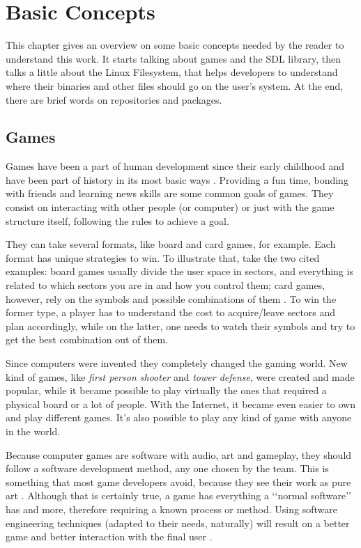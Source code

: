 \chapter{Basic Concepts}
\label {sec:basic_concepts}

This chapter gives an overview on some basic concepts needed by the reader to understand this work. It starts talking about games and the SDL library, then talks a little about the Linux Filesystem, that helps developers to understand where their binaries and other files should go on the user's system. At the end, there are brief words on repositories and packages.

\section{Games}
\label {sec:games}

Games have been a part of human development since their early childhood and have been part of history in its most basic ways \cite{bethke2003game}. Providing a fun time, bonding with friends and learning news skills are some common goals of games. They consist on interacting with other people (or computer) or just with the game structure itself, following the rules to achieve a goal.

They can take several formats, like board and card games, for example. Each format has unique strategies to win. To illustrate that, take the two cited examples: board games usually divide the user space in sectors, and everything is related to which sectors you are in and how you control them; card games, however, rely on the symbols and possible combinations of them \cite{crawford1984art}. To win the former type, a player has to understand the cost to acquire/leave sectors and plan accordingly, while on the latter, one needs to watch their symbols and try to get the best combination out of them.

Since computers were invented they completely changed the gaming world. New kind of games, like \textit{first person shooter} and \textit{tower defense}, were created and made popular, while it became possible to play virtually the ones that required a physical board or a lot of people. With the Internet, it became even easier to own and play different games. It's also possible to play any kind of game with anyone in the world.

Because computer games are software with audio, art and gameplay, they should follow a software development method, any one chosen by the team. This is something that most game developers avoid, because they see their work as pure art \cite{bethke2003game}. Although that is certainly true, a game has everything a \lq\lq normal software\rq\rq{} has and more, therefore requiring a known process or method. Using software engineering techniques (adapted to their needs, naturally) will result on a better game and better interaction with the final user \cite{pressman2009software}.


